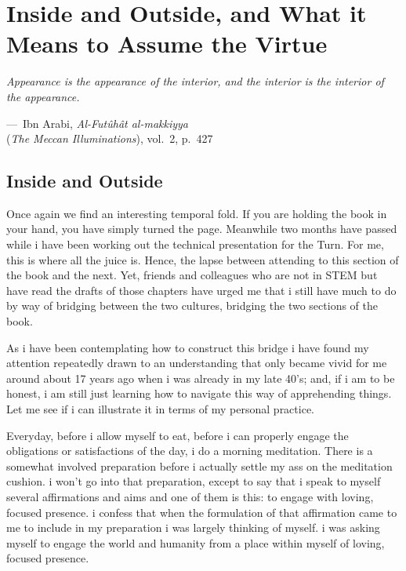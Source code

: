 \chapter{Inside and Outside, and What it Means to Assume the Virtue}
\label{chap:pledge-ch4}

\setlength{\epigraphwidth}{0.62\textwidth}
\setlength{\epigraphrule}{0pt}

\epigraph{\itshape Appearance is the appearance of the interior, and the
interior is the interior of the appearance.}%
{---~Ibn Arabi, \emph{Al-Fut\^uh\^at al-makkiyya}\\(\emph{The Meccan
Illuminations}), vol.~2, p.~427}

\section{Inside and Outside}
\label{sec:pledge-xii}

Once again we find an interesting temporal fold. If you are holding the book in your hand, you have simply turned the page. Meanwhile two months have passed while i have been working out the technical presentation for the Turn. For me, this is where all the juice is. Hence, the lapse between attending to this section of the book and the next. Yet, friends and colleagues who are not in STEM but have read the drafts of those chapters have urged me that i still have much to do by way of bridging between the two cultures, bridging the two sections of the book.

As i have been contemplating how to construct this bridge i have found my attention repeatedly drawn to an understanding that only became vivid for me around about 17 years ago when i was already in my late 40's; and, if i am to be honest, i am still just learning how to navigate this way of apprehending things. Let me see if i can illustrate it in terms of my personal practice.

Everyday, before i allow myself to eat, before i can properly engage the obligations or satisfactions of the day, i do a morning meditation. There is a somewhat involved preparation before i actually settle my ass on the meditation cushion. i won't go into that preparation, except to say that i speak to myself several affirmations and aims and one of them is this: to engage with loving, focused presence. i confess that when the formulation of that affirmation came to me to include in my preparation i was largely thinking of myself. i was asking myself to engage the world and humanity from a place within myself of loving, focused presence.

